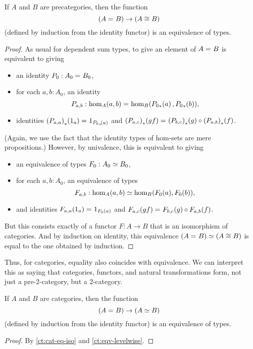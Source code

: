 \begin{lem}\label{ct:cat-eq-iso}
  If $A$ and $B$ are precategories, then the function
  \[(A =_{} B) \to (A\cong B)\]
  (defined by induction from the identity functor) is an equivalence of types.
\end{lem}
\begin{proof}
  As usual for dependent sum types, to give an element of $A =_{} B$ is equivalent to giving
  \begin{itemize}
  \item an identity $P_0:A_0 =_{} B_0$,
  \item for each $a,b:A_0$, an identity
    \[P_{a,b}:\hom_A(a,b) =_{} \hom_B({P_0}_{*}\!\left({a}\right),{P_0}_{*}\!\left({b}\right)),\]
  \item identities ${(P_{a,a})}_{*}\!\left({1_a}\right) =_{} 1_{{P_0}_{*}\!\left({a}\right)}$ and ${(P_{a,c})}_{*}\!\left({gf}\right) =_{} {(P_{b,c})}_{*}\!\left({g}\right) \circ {(P_{a,b})}_{*}\!\left({f}\right)$.
  \end{itemize}
  (Again, we use the fact that the identity types of hom-sets are mere propositions.)
  However, by univalence, this is equivalent to giving
  \begin{itemize}
  \item an equivalence of types $F_0:A_0 \simeq B_0$,
  \item for each $a,b:A_0$, an equivalence of types
    \[F_{a,b}:\hom_A(a,b) \simeq \hom_B(F_0 (a),F_0 (b)),\]
  \item and identities $F_{a,a}(1_a) =_{} 1_{F_0 (a)}$ and $F_{a,c}(gf) =_{} F_{b,c} (g)\circ F_{a,b} (f)$.
  \end{itemize}
  But this consists exactly of a functor $F:A\to B$ that is an isomorphism of categories.
  And by induction on identity, this equivalence $(A =_{} B) \simeq (A\cong B)$ is equal to the one obtained by induction.
\end{proof}

Thus, for categories, equality also coincides with equivalence.
We can interpret this as saying that categories, functors, and natural transformations form, not just a pre-2-category, but a 2-category.

\begin{thm}\label{ct:cat-2cat}
  If $A$ and $B$ are categories, then the function
  \[(A =_{} B) \to (A\simeq B)\]
  (defined by induction from the identity functor) is an equivalence of types.
\end{thm}
\begin{proof}
  By \autoref{ct:cat-eq-iso} and \autoref{ct:eqv-levelwise}.
\end{proof}

